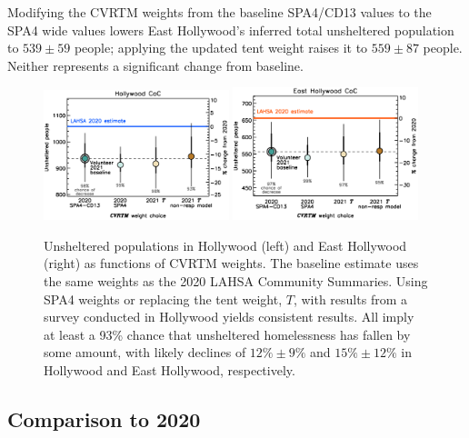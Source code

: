 \documentclass[11pt,twocolumn]{article}
\def\resp{respectively}
\begin{document}
Modifying the CVRTM weights from the baseline SPA4/CD13 values to the SPA4 wide values 
lowers East Hollywood's inferred total unsheltered population to $539\pm59$ people; applying
the updated tent weight raises it to $559\pm87$ people. Neither represents a significant change from 
baseline.

\begin{figure}[]
	\centering
	\includegraphics[width = 0.48\textwidth, trim = 0cm 0.5cm 0cm 0cm]{hwoodFinal}
	\includegraphics[width = 0.48\textwidth, trim = 0cm 0.5cm 0cm 0cm]{ehoFinal}	
	\caption{Unsheltered populations in Hollywood (left) and East Hollywood (right) 
			as functions of CVRTM weights. The baseline estimate uses the same weights as the 
			2020 LAHSA Community Summaries. Using SPA4 weights or replacing the tent 
			weight, $T$, with results from a survey conducted in Hollywood yields consistent
			results. All imply at least a 93\% chance that unsheltered homelessness has fallen
			by some amount, with likely declines of $12\%\pm9\%$ and $15\%\pm12\%$
			in Hollywood and East Hollywood, \resp.}
	\label{fig:wtComp}
\end{figure}



\subsection{Comparison to 2020}
\label{sec:comp}
\end{document}
